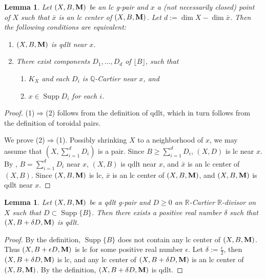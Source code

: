 \documentclass[11pt]{amsart}
\numberwithin{equation}{section}
\newcommand{\Mm}{{\bf{M}}}
\newcommand{\Qq}{\mathbb{Q}}
\newcommand{\Rr}{\mathbb{R}}
\newcommand{\Supp}{\operatorname{Supp}}
\newtheorem{lem}[thm]{Lemma}
\theoremstyle{definition}
\theoremstyle{definition}
\theoremstyle{definition}
\begin{document}
\begin{lem}\label{lem: qdlt equivalent definition}
Let $(X,B,\Mm)$ be an lc g-pair and $x$ a (not necessarily closed) point of $X$ such that $\bar x$ is an lc center of $(X,B,\Mm)$. Let $d:=\dim X-\dim \bar x$. Then the following conditions are equivalent:
\begin{enumerate}
  \item $(X,B,\Mm)$ is qdlt near $x$.
  \item There exist components $D_1,\dots,D_{d}$ of $\lfloor B\rfloor$, such that 
  \begin{enumerate}
      \item $K_X$ and each $D_i$ is $\Qq$-Cartier near $x$, and
      \item $x\in\Supp D_i$ for each $i$.
  \end{enumerate}
\end{enumerate}
\end{lem}

\begin{proof}
(1)$\Rightarrow$(2) follows from the definition of qdlt, which in turn follows from the definition of toroidal pairs. 
    
We prove (2)$\Rightarrow$(1). Possibly shrinking $X$ to a neighborhood of $x$, we may assume that $(X,\sum_{i=1}^{d}D_i)$ is a pair. Since $B\geq\sum_{i=1}^{d}D_i$, $(X,D)$ is lc near $x$. By \cite[Proposition 34]{dFKX17}, $B=\sum_{i=1}^dD_i$ near $x$, $(X,B)$ is qdlt near $x$, and $\bar x$ is an lc center of $(X,B)$. Since $(X,B,\Mm)$ is lc, $\bar x$ is an lc center of $(X,B,\Mm)$, and $(X,B,\Mm)$ is qdlt near $x$.
\end{proof}

\begin{lem}\label{lem: qdlt perturbation}
Let $(X,B,\Mm)$ be a qdlt g-pair and $D\geq 0$ an $\Rr$-Cartier $\Rr$-divisor on $X$ such that $D\subset\Supp\{B\}$. Then there exists a positive real number $\delta$ such that $(X,B+\delta D,\Mm)$ is qdlt.
\end{lem}
\begin{proof}
By the definition, $\Supp\{B\}$ does not contain any lc center of $(X,B,\Mm)$. Thus $(X,B+\epsilon D,\Mm)$ is lc for some positive real number $\epsilon$. Let $\delta:=\frac{\epsilon}{2}$, then $(X,B+\delta D,\Mm)$ is lc, and any lc center of $(X,B+\delta D,\Mm)$ is an lc center of $(X,B,\Mm)$. By the definition, $(X,B+\delta D,\Mm)$ is qdlt.
\end{proof}
\end{document}
